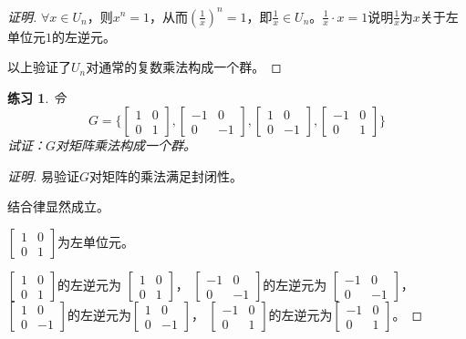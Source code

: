 \documentclass{article}
\newtheorem{Exercise}{练习}
\begin{document}
\begin{CJK*}{UTF8}{gbsn}
\begin{proof}[证明]
    $\forall x\in U_n$，则$x^n=1$，从而$(\frac{1}{x})^n=1$，即$\frac{1}{x}\in U_n$。$\frac{1}{x}\cdot x =1$说明$\frac{1}{x}$为$x$关于左单位元$1$的左逆元。
  
    以上验证了$U_n$对通常的复数乘法构成一个群。
  \end{proof}
  
  \begin{Exercise}
   令
   \[G=\bigg\{\begin{bmatrix}
    1&0\\0&1
   \end{bmatrix},
   \begin{bmatrix}
    -1&0\\0&-1
   \end{bmatrix},
   \begin{bmatrix}
    1&0\\0&-1
   \end{bmatrix},
   \begin{bmatrix}
    -1&0\\0&1
   \end{bmatrix}\bigg\}\] 
   试证：$G$对矩阵乘法构成一个群。
  \end{Exercise}
  
  \begin{proof}[证明]
    易验证$G$对矩阵的乘法满足封闭性。
  
    结合律显然成立。
  
    $\begin{bmatrix}
      1&0\\0&1
     \end{bmatrix}$为左单位元。
  
     $\begin{bmatrix}
      1&0\\0&1
     \end{bmatrix}$的左逆元为
     $\begin{bmatrix}
      1&0\\0&1
     \end{bmatrix}$，
     $\begin{bmatrix}
      -1&0\\0&-1
     \end{bmatrix}$的左逆元为
     $\begin{bmatrix}
      -1&0\\0&-1
     \end{bmatrix}$，
     $\begin{bmatrix}
      1&0\\0&-1
     \end{bmatrix}$的左逆元为$\begin{bmatrix}
      1&0\\0&-1
     \end{bmatrix}$，
     $\begin{bmatrix}
      -1&0\\0&1
     \end{bmatrix}$的左逆元为$\begin{bmatrix}
      -1&0\\0&1
     \end{bmatrix}$。
  

\end{proof}
\end{CJK*}
\end{document}
